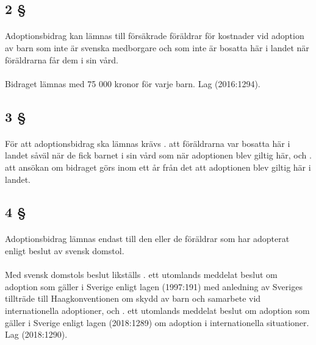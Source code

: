 \documentclass[a4paper,notitlepage,openany,10pt]{book}
\begin{document}
\subsection*{2 §}
\paragraph*{}
Adoptionsbidrag kan lämnas till försäkrade föräldrar för kostnader vid adoption av barn som inte är svenska medborgare och som inte är bosatta här i landet när föräldrarna får dem i sin vård.
\paragraph*{}
Bidraget lämnas med 75 000 kronor för varje barn.
Lag (2016:1294).
\subsection*{3 §}
\paragraph*{}
För att adoptionsbidrag ska lämnas krävs
. att föräldrarna var bosatta här i landet såväl när de fick barnet i sin vård som när adoptionen blev giltig här, och
. att ansökan om bidraget görs inom ett år från det att adoptionen blev giltig här i landet.
\subsection*{4 §}
\paragraph*{}
Adoptionsbidrag lämnas endast till den eller de föräldrar som har adopterat enligt beslut av svensk domstol.
\paragraph*{}
Med svensk domstols beslut likställs
. ett utomlands meddelat beslut om adoption som gäller i Sverige enligt lagen (1997:191) med anledning av Sveriges tillträde till Haagkonventionen om skydd av barn och samarbete vid internationella adoptioner, och
. ett utomlands meddelat beslut om adoption som gäller i Sverige enligt lagen (2018:1289) om adoption i internationella situationer.
Lag (2018:1290).
\end{document}
